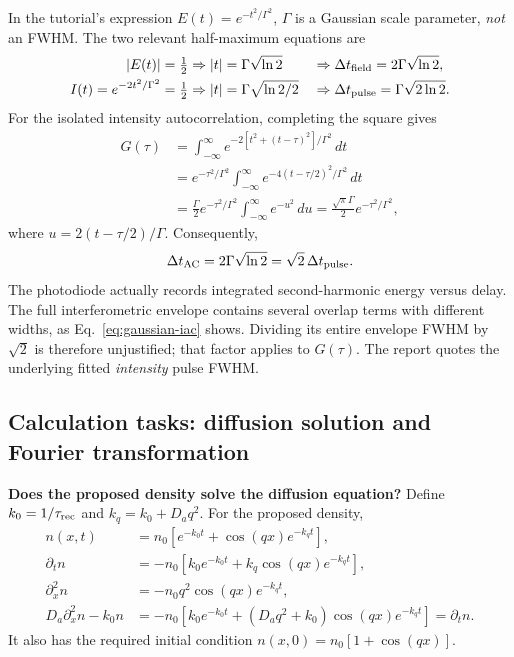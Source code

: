 In the tutorial's expression $E(t)=e^{-t^2/\Gamma^2}$, $\Gamma$ is a Gaussian scale parameter, \emph{not} an FWHM. The two relevant half-maximum equations are
\begin{align}
|E(t)|=\tfrac12&\Rightarrow |t|=\Gamma\sqrt{\ln2}
&&\Rightarrow \Delta t_{\rm field}=2\Gamma\sqrt{\ln2},\\
I(t)=e^{-2t^2/\Gamma^2}=\tfrac12
&\Rightarrow |t|=\Gamma\sqrt{\ln2/2}
&&\Rightarrow \Delta t_{\rm pulse}=\Gamma\sqrt{2\ln2}.
\end{align}
For the isolated intensity autocorrelation, completing the square gives
\begin{align}
G(\tau)&=\int_{-\infty}^{\infty}
e^{-2[t^2+(t-\tau)^2]/\Gamma^2}\,dt\\
&=e^{-\tau^2/\Gamma^2}
\int_{-\infty}^{\infty}e^{-4(t-\tau/2)^2/\Gamma^2}\,dt\\
&=\frac{\Gamma}{2}e^{-\tau^2/\Gamma^2}
\int_{-\infty}^{\infty}e^{-u^2}\,du
=\frac{\sqrt{\pi}\Gamma}{2}e^{-\tau^2/\Gamma^2},
\end{align}
where $u=2(t-\tau/2)/\Gamma$. Consequently,
\begin{equation}
\Delta t_{\rm AC}=2\Gamma\sqrt{\ln2}
=\sqrt2\,\Delta t_{\rm pulse}.
\end{equation}
The photodiode actually records integrated second-harmonic energy versus delay. The full interferometric envelope contains several overlap terms with different widths, as Eq.~\eqref{eq:gaussian-iac} shows. Dividing its entire envelope FWHM by $\sqrt2$ is therefore unjustified; that factor applies to $G(\tau)$. The report quotes the underlying fitted \emph{intensity} pulse FWHM.

\subsection{Calculation tasks: diffusion solution and Fourier transformation}
\textbf{Does the proposed density solve the diffusion equation?}
Define $k_0=1/\tau_{\rm rec}$ and $k_q=k_0+D_aq^2$. For the proposed density,
\begin{align}
n(x,t)&=n_0[e^{-k_0t}+\cos(qx)e^{-k_qt}],\\
\partial_t n&=-n_0[k_0e^{-k_0t}+k_q\cos(qx)e^{-k_qt}],\\
\partial_x^2 n&=-n_0q^2\cos(qx)e^{-k_qt},\\
D_a\partial_x^2n-k_0n
&=-n_0[k_0e^{-k_0t}+(D_aq^2+k_0)\cos(qx)e^{-k_qt}]
=\partial_t n.
\end{align}
It also has the required initial condition $n(x,0)=n_0[1+\cos(qx)]$.

